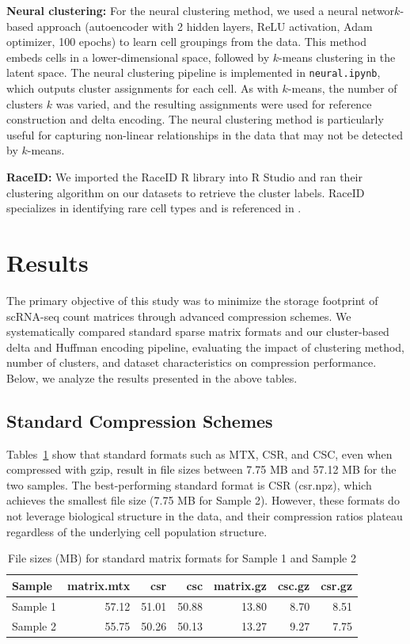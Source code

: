 \documentclass[unnumsec,webpdf,contemporary,large]{oup-authoring-template}
\begin{document}
\textbf{Neural clustering:} For the neural clustering method, we used a neural networ$k$-based approach (autoencoder with 2 hidden layers, ReLU activation, Adam optimizer, 100 epochs) to learn cell groupings from the data. This method embeds cells in a lower-dimensional space, followed by $k$-means clustering in the latent space. The neural clustering pipeline is implemented in \texttt{neural.ipynb}, which outputs cluster assignments for each cell. As with $k$-means, the number of clusters $k$ was varied, and the resulting assignments were used for reference construction and delta encoding. The neural clustering method is particularly useful for capturing non-linear relationships in the data that may not be detected by $k$-means.

\textbf{RaceID:} We imported the RaceID R library into R Studio and ran their clustering algorithm on our datasets to retrieve the cluster labels. RaceID specializes in identifying rare cell types and is referenced in \cite{raceID}.

\section{Results}

The primary objective of this study was to minimize the storage footprint of scRNA-seq count matrices through advanced compression schemes. We systematically compared standard sparse matrix formats and our cluster-based delta and Huffman encoding pipeline, evaluating the impact of clustering method, number of clusters, and dataset characteristics on compression performance. Below, we analyze the results presented in the above tables.

\subsection{Standard Compression Schemes}
Tables~\ref{tab:standard_file_sizes_mb} show that standard formats such as MTX, CSR, and CSC, even when compressed with gzip, result in file sizes between 7.75 MB and 57.12 MB for the two samples. The best-performing standard format is CSR (csr.npz), which achieves the smallest file size (7.75 MB for Sample 2). However, these formats do not leverage biological structure in the data, and their compression ratios plateau regardless of the underlying cell population structure.

\begin{table}[h!]
\centering
\caption{File sizes (MB) for standard matrix formats for Sample 1 and Sample 2}
\begin{tabular}{lrrrrrr}
\hline
Sample & matrix.mtx & csr & csc & matrix.gz & csc.gz & csr.gz \\
\hline
Sample 1 & 57.12 & 51.01 & 50.88 & 13.80 & 8.70 & 8.51 \\
Sample 2 & 55.75 & 50.26 & 50.13 & 13.27 & 9.27 & 7.75 \\
\hline
\end{tabular}
\label{tab:standard_file_sizes_mb}
\end{table}
\end{document}
